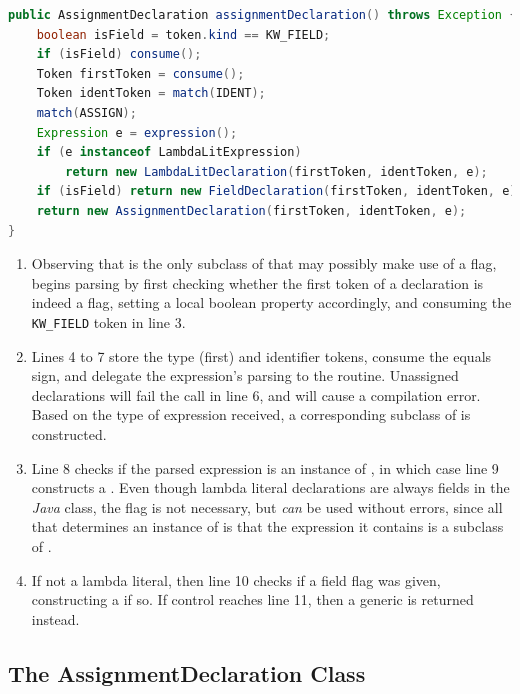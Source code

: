 \begin{lstlisting}[language=Java,caption={Parsing Top-Level Declarations.},label={alg:assign}]
public AssignmentDeclaration assignmentDeclaration() throws Exception {
	boolean isField = token.kind == KW_FIELD;
	if (isField) consume();
	Token firstToken = consume();
	Token identToken = match(IDENT);
	match(ASSIGN);
	Expression e = expression();
	if (e instanceof LambdaLitExpression)
		return new LambdaLitDeclaration(firstToken, identToken, e);
	if (isField) return new FieldDeclaration(firstToken, identToken, e);
	return new AssignmentDeclaration(firstToken, identToken, e);
}
\end{lstlisting}

\begin{enumerate}
	\addtocounter{enumi}{1}
	\item Observing that  is the only subclass of  that may possibly make use of a  flag,  begins parsing by first checking whether the first token of a declaration is indeed a  flag, setting a local boolean property accordingly, and consuming the \texttt{KW\_FIELD} token in line 3.
	\addtocounter{enumi}{1}
	\item Lines 4 to 7 store the type (first) and identifier tokens, consume the equals sign, and delegate the expression's parsing to the  routine. Unassigned declarations will fail the  call in line 6, and will cause a compilation error. Based on the type of expression received, a corresponding subclass of  is constructed.
	\addtocounter{enumi}{3}
	\item Line 8 checks if the parsed expression is an instance of , in which case line 9 constructs a . Even though lambda literal declarations are always fields in the \emph{Java} class, the  flag is not necessary, but \emph{can} be used without errors, since all that determines an instance of  is that the expression it contains is a subclass of .
	\item If not a lambda literal, then line 10 checks if a field flag was given, constructing a  if so. If control reaches line 11, then a generic  is returned instead.
\end{enumerate}

\subsection{The AssignmentDeclaration Class}

